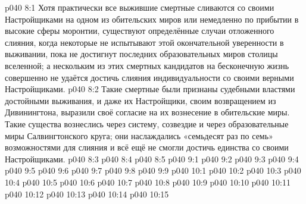 \vs p040 8:1 Хотя практически все выжившие смертные сливаются со своими Настройщиками на одном из обительских миров или немедленно по прибытии в высокие сферы моронтии, существуют определённые случаи отложенного слияния, когда некоторые не испытывают этой окончательной уверенности в выживании, пока не достигнут последних образовательных миров столицы вселенной; а нескольким из этих смертных кандидатов на бесконечную жизнь совершенно не удаётся достичь слияния индивидуальности со своими верными Настройщиками.
\vs p040 8:2 Такие смертные были признаны судебными властями достойными выживания, и даже их Настройщики, своим возвращением из Дивинингтона, выразили своё согласие на их вознесение в обительские миры. Такие существа вознеслись через систему, созвездие и через образовательные миры Салвингтонского круга; они наслаждались «семьдесят раз по семь» возможностями для слияния и всё ещё не смогли достичь единства со своими Настройщиками.
\vs p040 8:3 
\vs p040 8:4 \pc 
\vs p040 8:5 
\vs p040 9:1 
\vs p040 9:2 \pc 
\vs p040 9:3 
\vs p040 9:4 \pc 
\vs p040 9:5 
\vs p040 9:6 
\vs p040 9:7 
\vs p040 9:8 \pc 
\vs p040 9:9 \pc 
{}
\vs p040 10:1 
\vs p040 10:2 
\vs p040 10:3 \pc 
\vs p040 10:4 
\vs p040 10:5 \pc 
\vs p040 10:6 \pc 
\vs p040 10:7 
\vs p040 10:8 \pc 
\vs p040 10:9 \pc 
\vs p040 10:10 
\vs p040 10:11 
\vs p040 10:12 
\vs p040 10:13 \pc 
\vs p040 10:14 
\vsetoff
\vs p040 10:15 
\quizlink
